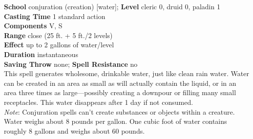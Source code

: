 \textbf{School} conjuration (creation) [water]; \textbf{Level} cleric 0, druid 0, paladin 1\\
\textbf{Casting Time} 1 standard action\\
\textbf{Components} V, S\\
\textbf{Range} close (25 ft. + 5 ft./2 levels)\\
\textbf{Effect} up to 2 gallons of water/level\\
\textbf{Duration} instantaneous\\
\textbf{Saving Throw} none; \textbf{Spell Resistance} no\\
This spell generates wholesome, drinkable water, just like clean rain water. Water can be created in an area as small as will actually contain the liquid, or in an area three times as large—possibly creating a downpour or filling many small receptacles. This water disappears after 1 day if not consumed.\\
\textit{Note}: Conjuration spells can't create substances or objects within a creature. Water weighs about 8 pounds per gallon. One cubic foot of water contains roughly 8 gallons and weighs about 60 pounds.\\
